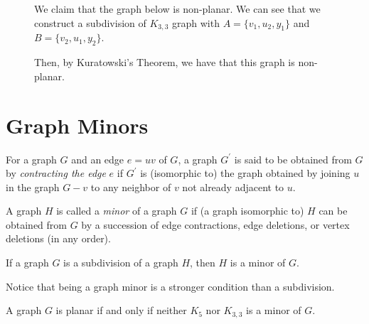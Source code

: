 \begin{figure}[ht]
\begin{nexample}
  We claim that the graph below is non-planar. We can see that we
  construct a subdivision of \(K_{3, 3}\) graph with \(A = \{v_1,
  u_2, y_1\}\) and \(B = \{v_2, u_1, y_2\}\).

  Then, by Kuratowski's Theorem, we have that this graph is
  non-planar.
\end{nexample}
\end{figure}

\section{Graph Minors}

\begin{definition}
  For a graph \(G\) and an edge \(e=u v\) of \(G\), a graph 
  \(G^{\prime}\) is said to be obtained from \(G\) by
  \textit{contracting the edge} \(e\) if \(G^{\prime}\) is
  (isomorphic to) the graph
  obtained by joining \(u\) in the graph \(G-v\) to any neighbor
  of \(v\) not already adjacent to \(u\).
\end{definition}

\begin{definition}
  A graph \(H\) is called a \textit{minor} of a graph \(G\) if
  (a graph isomorphic to) \(H\) can be obtained from \(G\) by a
  succession of edge contractions, edge deletions, or vertex
  deletions (in any order). 
\end{definition}

\begin{theorem}
  If a graph \(G\) is a subdivision of a graph \(H\), then \(H\)
  is a minor of \(G\).
\end{theorem}

Notice that being a graph minor is a stronger condition than a
subdivision.

\begin{theorem}
  A graph \(G\) is planar if and only if neither \(K_5\) nor
  \(K_{3, 3}\) is a minor of \(G\).
\end{theorem}

